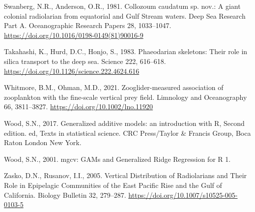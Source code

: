 \documentclass[
]{article}
\newlength{\cslhangindent}
\newenvironment{CSLReferences}[2] %
 {\begin{list}{}{%
  \setlength{\itemindent}{0pt}
  \setlength{\leftmargin}{0pt}
  \setlength{\parsep}{0pt}
  \ifodd #1
   \setlength{\leftmargin}{\cslhangindent}
   \setlength{\itemindent}{-1\cslhangindent}
  \fi
  \setlength{\itemsep}{#2\baselineskip}}}
 {\end{list}}
\begin{document}
\begin{CSLReferences}{1}{0}
Swanberg, N.R., Anderson, O.R., 1981. Collozoum caudatum sp. nov.: A
giant colonial radiolarian from equatorial and Gulf Stream waters. Deep
Sea Research Part A. Oceanographic Research Papers 28, 1033--1047.
\url{https://doi.org/10.1016/0198-0149(81)90016-9}

Takahashi, K., Hurd, D.C., Honjo, S., 1983. Phaeodarian skeletons: Their
role in silica transport to the deep sea. Science 222, 616--618.
\url{https://doi.org/10.1126/science.222.4624.616}

Whitmore, B.M., Ohman, M.D., 2021. Zooglider-measured association of
zooplankton with the fine-scale vertical prey field. Limnology and
Oceanography 66, 3811--3827. \url{https://doi.org/10.1002/lno.11920}

Wood, S.N., 2017. Generalized additive models: an introduction with R,
Second edition. ed, Texts in statistical science. CRC Press/Taylor \&
Francis Group, Boca Raton London New York.

Wood, S.N., 2001. mgcv: GAMs and Generalized Ridge Regression for R 1.

Zasko, D.N., Rusanov, I.I., 2005. Vertical Distribution of Radiolarians
and Their Role in Epipelagic Communities of the East Pacific Rise and
the Gulf of California. Biology Bulletin 32, 279--287.
\url{https://doi.org/10.1007/s10525-005-0103-5}

\end{CSLReferences}
\end{document}

